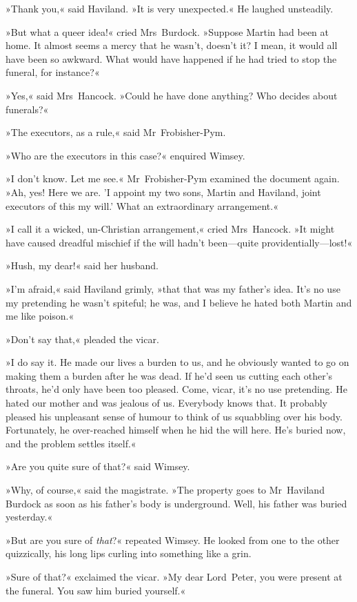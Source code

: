 »Thank you,« said Haviland. »It is very unexpected.« He laughed unsteadily.

»But what a queer idea!« cried Mrs~Burdock. »Suppose Martin had been at home. It almost seems a mercy that he wasn't, doesn't it? I mean, it would all have been so awkward. What would have happened if he had tried to stop the funeral, for instance?«

»Yes,« said Mrs~Hancock. »Could he have done anything? Who decides about funerals?«

»The executors, as a rule,« said Mr~Frobisher-Pym.

»Who are the executors in this case?« enquired Wimsey.

»I don't know. Let me see.« Mr~Frobisher-Pym examined the document again. »Ah, yes! Here we are. 'I appoint my two sons, Martin and Haviland, joint executors of this my will.' What an extraordinary arrangement.«

»I call it a wicked, un-Christian arrangement,« cried Mrs~Hancock. »It might have caused dreadful mischief if the will hadn't been—quite providentially—lost!«

»Hush, my dear!« said her husband.

»I'm afraid,« said Haviland grimly, »that that was my father's idea. It's no use my pretending he wasn't spiteful; he was, and I believe he hated both Martin and me like poison.«

»Don't say that,« pleaded the vicar.

»I do say it. He made our lives a burden to us, and he obviously wanted to go on making them a burden after he was dead. If he'd seen us cutting each other's throats, he'd only have been too pleased. Come, vicar, it's no use pretending. He hated our mother and was jealous of us. Everybody knows that. It probably pleased his unpleasant sense of humour to think of us squabbling over his body. Fortunately, he over-reached himself when he hid the will here. He's buried now, and the problem settles itself.«

»Are you quite sure of that?« said Wimsey.

»Why, of course,« said the magistrate. »The property goes to Mr~Haviland Burdock as soon as his father's body is underground. Well, his father was buried yesterday.«

»But are you sure of \textit{that}?« repeated Wimsey. He looked from one to the other quizzically, his long lips curling into something like a grin.

»Sure of that?« exclaimed the vicar. »My dear Lord~Peter, you were present at the funeral. You saw him buried yourself.«

